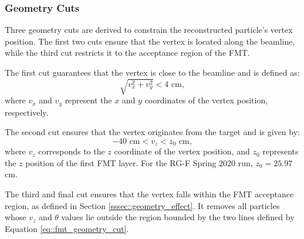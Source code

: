 \subsubsection{Geometry Cuts}
\label{sssec::geometry_cuts}
    Three geometry cuts are derived to constrain the reconstructed particle's vertex position.
    The first two cuts ensure that the vertex is located along the beamline, while the third cut restricts it to the acceptance region of the FMT.

    The first cut guarantees that the vertex is close to the beamline and is defined as:
    \begin{equation*}
        \sqrt{v_x^2 + v_y^2} < 4 \text{ cm},
    \end{equation*}
    where $v_x$ and $v_y$ represent the $x$ and $y$ coordinates of the vertex position, respectively.

    The second cut ensures that the vertex originates from the target and is given by:
    \begin{equation*}
        -40 \text{ cm} < v_z < z_0 \text{ cm},
    \end{equation*}
    where $v_z$ corresponds to the $z$ coordinate of the vertex position, and $z_0$ represents the $z$ position of the first FMT layer.
    For the RG-F Spring 2020 run, $z_0 = 25.97$ cm.

    The third and final cut ensures that the vertex falls within the FMT acceptance region, as defined in Section \ref{sssec::geometry_effect}.
    It removes all particles whose $v_z$ and $\theta$ values lie outside the region bounded by the two lines defined by Equation \eqref{eq::fmt_geometry_cut}.
